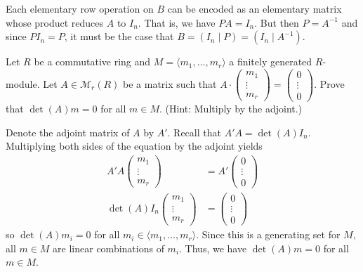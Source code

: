 \documentclass[../../master.tex]{subfiles}
\begin{document}
\begin{solution}
    Each elementary row operation on $B$ can be encoded as an elementary matrix whose product reduces $A$ to $I_n$.
    That is, we have $PA = I_n$.
    But then $P = A^{-1}$ and since $P I_n = P$, it must be the case that $B = (I_n \mid P) = (I_n \mid A^{-1})$.
\end{solution}

\begin{problem}
    Let $R$ be a commutative ring and $M = \langle m_1, \ldots, m_r \rangle$ a finitely generated $R$-module.
    Let $A \in \mathcal{M}_r(R)$ be a matrix such that $A \cdot
    \begin{pmatrix}
        m_1 \\
        \vdots \\
        m_r
    \end{pmatrix} =
    \begin{pmatrix}
        0 \\
        \vdots \\
        0
    \end{pmatrix}$.
    Prove that $\det(A)m = 0$ for all $m \in M$.
    (Hint: Multiply by the adjoint.)
\end{problem}

\begin{solution}
    Denote the adjoint matrix of $A$ by $A'$.
    Recall that $A' A = \det(A) I_n$.
    Multiplying both sides of the equation by the adjoint yields
    \begin{align*}
    A' A
    \begin{pmatrix}
        m_1 \\
        \vdots \\
        m_r
    \end{pmatrix} &=
    A'
    \begin{pmatrix}
        0 \\
        \vdots \\
        0
    \end{pmatrix} \\
    \det(A) I_n
    \begin{pmatrix}
        m_1 \\
        \vdots \\
        m_r
    \end{pmatrix} &=
    \begin{pmatrix}
        0 \\
        \vdots \\
        0
    \end{pmatrix}
    \end{align*}
    so $\det(A) m_i = 0$ for all $m_i \in \langle m_1, \ldots, m_r \rangle$.
    Since this is a generating set for $M$, all $m \in M$ are linear combinations of $m_i$.
    Thus, we have $\det(A) m = 0$ for all $m \in M$.
\end{solution}
\end{document}
